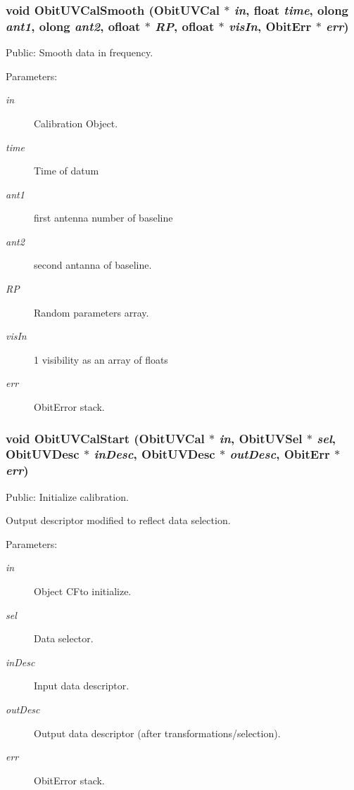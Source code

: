 \subsubsection{\setlength{\rightskip}{0pt plus 5cm}void Obit\-UVCal\-Smooth ({\bf Obit\-UVCal} $\ast$ {\em in}, float {\em time}, {\bf olong} {\em ant1}, {\bf olong} {\em ant2}, {\bf ofloat} $\ast$ {\em RP}, {\bf ofloat} $\ast$ {\em vis\-In}, {\bf Obit\-Err} $\ast$ {\em err})}\label{ObitUVCal_8h_a17}


Public: Smooth data in frequency. 

\begin{Desc}
\item[Parameters:]
\begin{description}
\item[{\em in}]Calibration Object. \item[{\em time}]Time of datum \item[{\em ant1}]first antenna number of baseline \item[{\em ant2}]second antanna of baseline. \item[{\em RP}]Random parameters array. \item[{\em vis\-In}]1 visibility as an array of floats \item[{\em err}]Obit\-Error stack. \end{description}
\end{Desc}
\subsubsection{\setlength{\rightskip}{0pt plus 5cm}void Obit\-UVCal\-Start ({\bf Obit\-UVCal} $\ast$ {\em in}, {\bf Obit\-UVSel} $\ast$ {\em sel}, {\bf Obit\-UVDesc} $\ast$ {\em in\-Desc}, {\bf Obit\-UVDesc} $\ast$ {\em out\-Desc}, {\bf Obit\-Err} $\ast$ {\em err})}\label{ObitUVCal_8h_a13}


Public: Initialize calibration. 

Output descriptor modified to reflect data selection. \begin{Desc}
\item[Parameters:]
\begin{description}
\item[{\em in}]Object CFto initialize. \item[{\em sel}]Data selector. \item[{\em in\-Desc}]Input data descriptor. \item[{\em out\-Desc}]Output data descriptor (after transformations/selection). \item[{\em err}]Obit\-Error stack. \end{description}
\end{Desc}
